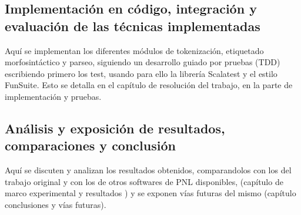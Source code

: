 \subsection*{Implementación en código, integración y evaluación de las técnicas implementadas}
Aquí se implementan los diferentes módulos de tokenización, etiquetado morfosintáctico y parseo, siguiendo un desarrollo guiado por pruebas (TDD) escribiendo primero los test, usando para ello la librería Scalatest y el estilo FunSuite. Esto se detalla en el capítulo de resolución del trabajo, en la parte de implementación y pruebas. 

\subsection*{Análisis y exposición de resultados, comparaciones y conclusión}   
Aquí se discuten y analizan los resultados obtenidos, comparandolos con los del trabajo original y con los de otros softwares de PNL disponibles, (capítulo de marco experimental y resultados ) y se exponen vías futuras del mismo (capítulo conclusiones y vías futuras).


